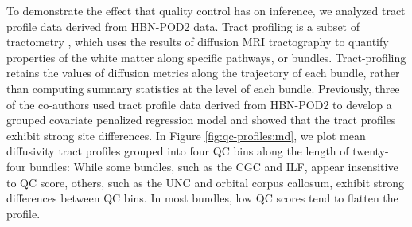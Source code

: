 \documentclass[fleqn,10pt]{wlscirep}
\begin{document}
To demonstrate the effect that quality control has on inference, we analyzed
tract profile data derived from HBN-POD2 data. Tract profiling
\cite{yeatman2012-rc,jones2005pasta,colby2012along,odonnell2009tract} is
a subset of tractometry \cite{jones2005pasta,bells2011tractometry}, which uses
the results of diffusion MRI tractography to quantify properties of the white
matter along specific pathways, or bundles. Tract-profiling retains the values
of diffusion metrics along the trajectory of each bundle, rather than computing
summary statistics at the level of each bundle. Previously, three of the co-authors
used tract profile data derived from HBN-POD2 to develop a grouped covariate penalized
regression model \cite{richie-halford2021multidimensional} and showed that
the tract profiles exhibit strong site differences. In Figure
\ref{fig:qc-profiles:md}, we plot mean diffusivity tract profiles grouped into
four QC bins along the length of twenty-four bundles:
While some bundles, such as the CGC and ILF, appear insensitive to
QC score, others, such as the UNC and orbital corpus callosum, exhibit
strong differences between QC bins. In most bundles, low QC scores
tend to flatten the profile.
\end{document}
